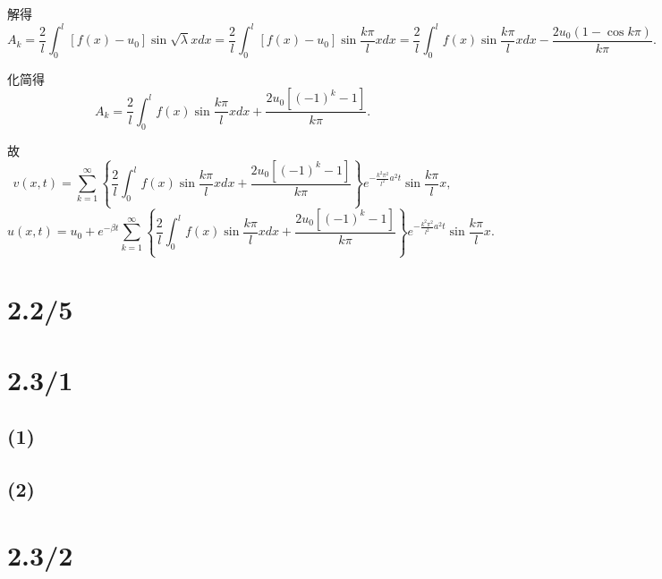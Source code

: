 \documentclass[11pt,a4paper]{article}
\begin{document}
解得
$$A_k=\frac{2}{l}\int_0^l [f(x)-u_0]\sin\sqrt{\lambda}xdx=\frac{2}{l}\int_0^l [f(x)-u_0]\sin \frac{k\pi}{l} xdx
=\frac{2}{l}\int_0^l f(x)\sin \frac{k\pi}{l} xdx-\frac{2u_0(1-\cos k\pi)}{k\pi}.$$

化简得
$$A_k=\frac{2}{l}\int_0^l f(x)\sin \frac{k\pi}{l} xdx+\frac{2u_0[(-1)^k-1]}{k\pi}.$$

故
$$v(x,t)=\sum_{k=1}^\infty \left\{\frac{2}{l}\int_0^l f(x)\sin \frac{k\pi}{l} xdx+\frac{2u_0[(-1)^k-1]}{k\pi}\right\} e^{-\frac{k^2\pi^2}{l^2}a^2t}\sin \frac{k\pi}{l} x,$$
$$u(x,t)=u_0+e^{-\beta t}\sum_{k=1}^\infty \left\{\frac{2}{l}\int_0^l f(x)\sin \frac{k\pi}{l} xdx+\frac{2u_0[(-1)^k-1]}{k\pi}\right\} e^{-\frac{k^2\pi^2}{l^2}a^2t}\sin \frac{k\pi}{l} x.$$

\section{2.2/5}

\section{2.3/1}

\subsection*{(1)}
\subsection*{(2)}

\section{2.3/2}
\end{document}
